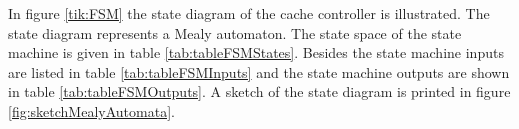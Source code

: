 
In figure \ref{tik:FSM} the state diagram of the cache controller is illustrated. The state diagram represents a Mealy automaton. The state space of the state machine is given in table \ref{tab:tableFSMStates}.
Besides the state machine inputs are listed in table \ref{tab:tableFSMInputs} and the state machine outputs are shown in table \ref{tab:tableFSMOutputs}. A sketch of the state diagram is printed in figure \ref{fig:sketchMealyAutomata}.

